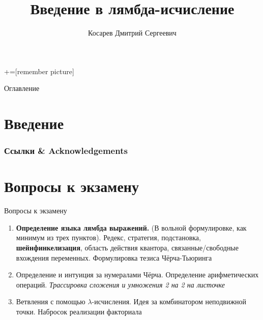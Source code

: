 \documentclass[aspectratio=169
  , xcolor={svgnames}
  , hyperref={colorlinks,citecolor=DeepPink4,linkcolor=DarkRed,urlcolor=DarkBlue}
  , russian  %
  ]{beamer}
\title{Введение в лямбда-исчисление}
\author{Косарев Дмитрий Сергеевич}
\date{\DTMDate{2026-02-18}}
\begin{document}
\maketitle

+=[remember picture]

\everymath{\displaystyle}

\begin{frame}{Оглавление}
  \tableofcontents
\end{frame}




\section{Введение}


\begin{frame}%
\frametitle<presentation>{Ссылки \& Acknowledgements}
\vspace{-1.5em}
\printbibliography
\end{frame}

\section{Вопросы к экзамену  }

\begin{frame}{Вопросы к экзамену  }
\begin{enumerate}
	\item \textbf{Определение языка лямбда выражений.} (В вольной формулировке, как минимум из трех пунктов). Редекс, стратегия, подстановка, \textbf{шейнфинкелизация}, область действия квантора, связанные/свободные вхождения переменных. Формулировка тезиса Чёрча-Тьюринга
	\item Определение и интуиция за нумералами Чёрча. Определение арифметических операций. \textit{Трассировка сложения и умножения 2 на 2 на листочке}
	\item Ветвления с помощью $\lambda$-исчисления. Идея за комбинатором неподвижной точки. Набросок реализации факториала

\end{enumerate}
\end{frame}
\end{document}
